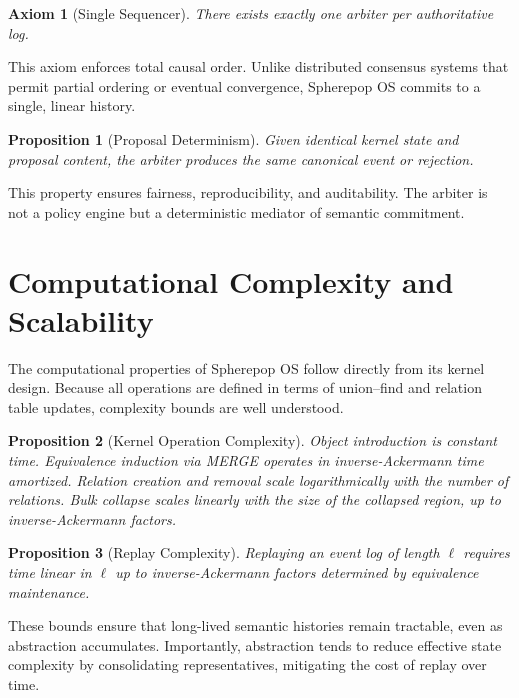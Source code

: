 \documentclass[11pt]{article}
\newtheorem{axiom}{Axiom}[section]
\newtheorem{proposition}{Proposition}[section]
\begin{document}
\begin{axiom}[Single Sequencer]
There exists exactly one arbiter per authoritative log.
\end{axiom}

This axiom enforces total causal order. Unlike distributed consensus systems
that permit partial ordering or eventual convergence, Spherepop OS commits
to a single, linear history.

\begin{proposition}[Proposal Determinism]
Given identical kernel state and proposal content, the arbiter produces the
same canonical event or rejection.
\end{proposition}

This property ensures fairness, reproducibility, and auditability. The
arbiter is not a policy engine but a deterministic mediator of semantic
commitment.

\section{Computational Complexity and Scalability}

The computational properties of Spherepop OS follow directly from its
kernel design. Because all operations are defined in terms of union--find
and relation table updates, complexity bounds are well understood.

\begin{proposition}[Kernel Operation Complexity]
Object introduction is constant time. Equivalence induction via MERGE
operates in inverse-Ackermann time amortized. Relation creation and removal
scale logarithmically with the number of relations. Bulk collapse scales
linearly with the size of the collapsed region, up to inverse-Ackermann
factors.
\end{proposition}

\begin{proposition}[Replay Complexity]
Replaying an event log of length $\ell$ requires time linear in $\ell$ up to
inverse-Ackermann factors determined by equivalence maintenance.
\end{proposition}

These bounds ensure that long-lived semantic histories remain tractable,
even as abstraction accumulates. Importantly, abstraction tends to reduce
effective state complexity by consolidating representatives, mitigating the
cost of replay over time.
\end{document}
